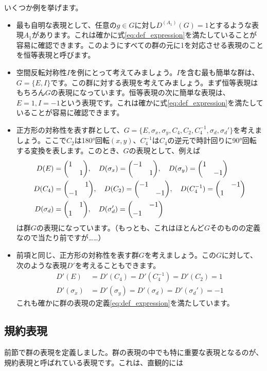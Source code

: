 \documentclass[uplatex,dvipdfmx,a4j]{jsarticle}
\begin{document}
いくつか例を挙げます。
\begin{itemize}
	\item 最も自明な表現として、任意の$g\in G$に対し$D^{(A_1)}(G) = 1$とするような表現$A_1$があります。これは確かに式\eqref{eq:def_expression}を満たしていることが容易に確認できます。このようにすべての群の元に1を対応させる表現のことを恒等表現と呼びます。
	\item 空間反転対称性$I$を例にとって考えてみましょう。$I$を含む最も簡単な群は、$G = \{E,I\}$です。この群に対する表現を考えてみましょう。まず恒等表現はもちろん$G$の表現になっています。恒等表現の次に簡単な表現は、$E=1, I=-1$という表現です。これは確かに式\eqref{eq:def_expression}を満たしていることが容易に確認できます。
	\item 正方形の対称性を表す群として、$G = \{ E, \sigma_x, \sigma_y, C_4, C_2, C_4^{-1}, \sigma_d, \sigma_d'\}$を考えましょう。ここで$C_2$は180°回転$(x,y)$、$C_4^{-1}$は$C_4$の逆元で時計回りに90°回転する変換を表します。このとき、$G$の表現として、例えば\begin{align}
		D(E) &= \mqty(\dmat{1,1}) \qc D(\sigma_x) = \mqty(\dmat{-1,1}) \qc D(\sigma_y) = \mqty(\dmat{1,-1}) \\
		D(C_4) &= \mqty(\admat{1,-1}) \qc D(C_2) = \mqty(\dmat{-1,-1}) \qc D(C_4^{-1}) = \mqty(\admat{-1,1}) \\
		D(\sigma_d) &= \mqty(\admat{1,1}) \qc D(\sigma_d') = \mqty(\admat{-1,-1})
	\end{align}
	は群$G$の表現になっています。（もっとも、これはほとんど$G$そのものの定義なので当たり前ですが……）
	\item 前項と同じ、正方形の対称性を表す群$G$を考えましょう。この$G$に対して、次のような表現$D'$を考えることもできます。\begin{align}
		D'(E) &= D'(C_4) = D'(C_4^{-1}) = D'(C_2) = 1\\
		D'(\sigma_x) &= D'(\sigma_y) = D'(\sigma_d) = D'(\sigma_d') = -1
	\end{align}
	これも確かに群の表現の定義\eqref{eq:def_expression}を満たしています。
\end{itemize}

\subsection{規約表現}
前節で群の表現を定義しました。群の表現の中でも特に重要な表現となるのが、規約表現と呼ばれている表現です。これは、直観的には
\end{document}
